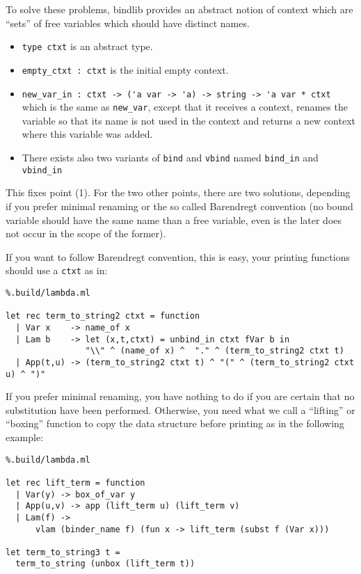\documentclass[11pt]{article}
\begin{document}
To solve these problems, bindlib provides an abstract notion of context
 which are ``sets'' of free variables which should have
 distinct names.
\begin{itemize}
\item\verb#type ctxt# is  an abstract type.
\item\verb#empty_ctxt : ctxt# is the initial empty context.
\item\verb#new_var_in : ctxt -> ('a var -> 'a) -> string -> 'a var * ctxt#\\
  which is the same as \verb#new_var#, except that it receives a
  context, renames the variable so that its name is not used in the
  context and returns a new context where this variable was added.
\item There exists also two variants of \verb#bind# and \verb#vbind#
  named \verb#bind_in# and \verb#vbind_in#
\end{itemize}

This fixes point (1). For the two other points, there are two solutions,
depending if you prefer minimal renaming or the so called Barendregt
convention (no bound variable should have the same name than a free
variable, even is the later does not occur in the scope of the
former).

If you want to follow Barendregt convention, this is easy, your
printing functions should use a \verb#ctxt# as in:

\begin{lstlisting}%.build/lambda.ml

let rec term_to_string2 ctxt = function
  | Var x    -> name_of x
  | Lam b    -> let (x,t,ctxt) = unbind_in ctxt fVar b in
                "\\" ^ (name_of x) ^  "." ^ (term_to_string2 ctxt t)
  | App(t,u) -> (term_to_string2 ctxt t) ^ "(" ^ (term_to_string2 ctxt u) ^ ")"
\end{lstlisting}

If you prefer minimal renaming, you have nothing to do if you are
certain that no substitution have been performed. Otherwise, you need
what we call a ``lifting'' or ``boxing'' function to copy the data structure before
printing as in the following example:

\begin{lstlisting}%.build/lambda.ml

let rec lift_term = function
  | Var(y) -> box_of_var y
  | App(u,v) -> app (lift_term u) (lift_term v)
  | Lam(f) ->
      vlam (binder_name f) (fun x -> lift_term (subst f (Var x)))

let term_to_string3 t =
  term_to_string (unbox (lift_term t))
\end{lstlisting}
\end{document}
